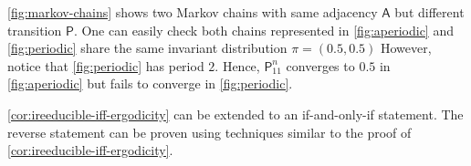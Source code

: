 \documentclass[a4paper]{article}
\begin{document}
\begin{remark}
	\autoref{fig:markov-chains} shows two Markov chains with same adjacency $\mathsf{A}$ but different transition $\mathsf{P}$.
	One can easily check both chains represented in \autoref{fig:aperiodic} and \autoref{fig:periodic}
	share the same invariant distribution $\pi=(0.5,0.5)$
	However, notice that \autoref{fig:periodic} has period $2$.
	Hence, $\mathsf{P}_{11}^{n}$ converges to $0.5$ in \autoref{fig:aperiodic} but fails to converge in \autoref{fig:periodic}.
\end{remark}

\begin{remark}
	\autoref{cor:ireeducible-iff-ergodicity} can be extended to an if-and-only-if statement.
	The reverse statement can be proven using techniques similar to the proof of \autoref{cor:ireeducible-iff-ergodicity}.
\end{remark}

\printglossaries
\printbibliography
\end{document}
